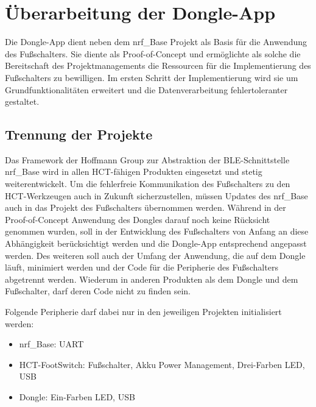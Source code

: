 \section{Überarbeitung der Dongle-App}
Die Dongle-App dient neben dem nrf\_Base Projekt als Basis für die Anwendung des Fußschalters. Sie diente als Proof-of-Concept und ermöglichte als solche die Bereitschaft des Projektmanagements die Ressourcen für die Implementierung des Fußschalters zu bewilligen. Im ersten Schritt der Implementierung wird sie um Grundfunktionalitäten erweitert und die Datenverarbeitung fehlertoleranter gestaltet.

\subsection{Trennung der Projekte}
Das Framework der Hoffmann Group zur Abstraktion der \ac{BLE}-Schnittstelle nrf\_Base wird in allen \ac{HCT}-fähigen Produkten eingesetzt und stetig weiterentwickelt. Um die fehlerfreie Kommunikation des Fußschalters zu den \ac{HCT}-Werkzeugen auch in Zukunft sicherzustellen, müssen Updates des nrf\_Base auch in das Projekt des Fußschalters übernommen werden. Während in der Proof-of-Concept Anwendung des Dongles darauf noch keine Rücksicht genommen wurden, soll in der Entwicklung des Fußschalters von Anfang an diese Abhängigkeit berücksichtigt werden und die Dongle-App entsprechend angepasst werden. Des weiteren soll auch der Umfang der Anwendung, die auf dem Dongle läuft, minimiert werden und der Code für die Peripherie des Fußschalters abgetrennt werden. Wiederum in anderen Produkten als dem Dongle und dem Fußschalter, darf deren Code nicht zu finden sein.

Folgende Peripherie darf dabei nur in den jeweiligen Projekten initialisiert werden:
\begin{itemize}
	\item nrf\_Base: UART
	\item \ac{HCT}-FootSwitch: Fußschalter, Akku Power Management, Drei-Farben LED, \ac{USB}
	\item Dongle: Ein-Farben LED, \ac{USB}
\end{itemize}

